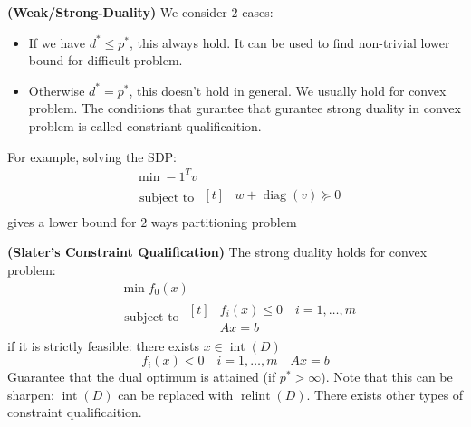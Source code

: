 \begin{definition}{\textbf{(Weak/Strong-Duality)}}
    We consider $2$ cases:
    \begin{itemize}
        \item If we have $d^*\le p^*$, this always hold. It can be used to find non-trivial lower bound for difficult problem. 
        \item Otherwise $d^*=p^*$, this doesn't hold in general. We usually hold for convex problem. The conditions that gurantee that gurantee strong duality in convex problem is called constriant qualificaition.
    \end{itemize}
\end{definition}

\begin{remark}
    For example, solving the SDP:
    \begin{equation*}
    \begin{aligned}
        &\min -1^Tv \\
        &\text{ subject to } \begin{aligned}[t]
            &w+\operatorname{diag}(v)\succeq0 \\
        \end{aligned}
    \end{aligned}
    \end{equation*} 
    gives a lower bound for $2$ ways partitioning problem 
\end{remark}

\begin{definition}{\textbf{(Slater's Constraint Qualification)}}
    The strong duality holds for convex problem:
    \begin{equation*}
    \begin{aligned}
        &\min f_0(x) \\
        &\text{ subject to } \begin{aligned}[t]
            &f_i(x)\le0 \quad i=1,\dots,m \\
            &Ax=b
        \end{aligned}
    \end{aligned}
    \end{equation*} 
    if it is strictly feasible: there exists $x\in\operatorname{int}(D)$
    \begin{equation*}
        f_i(x)< 0 \quad i =1,\dots,m \quad Ax = b
    \end{equation*}
    Guarantee that the dual optimum is attained (if $p^*>\infty$). Note that this can be sharpen: $\operatorname{int}(D)$ can be replaced with $\operatorname{relint}(D)$. There exists other types of constraint qualificaition.
\end{definition}

